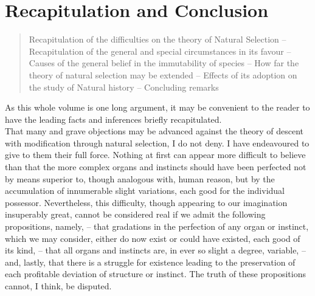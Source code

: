 \chapter{Recapitulation and Conclusion}

\begin{quotation}
Recapitulation of the difficulties on the theory of Natural Selection -- Recapitulation of the general and special circumstances in its favour -- Causes of the general belief in the immutability of species -- How far the theory of natural selection may be extended -- Effects of its adoption on the study of Natural history -- Concluding remarks
\end{quotation}

\indent As this whole volume is one long argument, it may be convenient to the reader to have the leading facts and inferences briefly recapitulated.~\\
\indent That many and grave objections may be advanced against the theory of descent with modification through natural selection, I do not deny.  I have endeavoured to give to them their full force. Nothing at first can appear more difficult to believe than that the more complex organs and instincts should have been perfected not by means superior to, though analogous with, human reason, but by the accumulation of innumerable slight variations, each good for the individual possessor. Nevertheless, this difficulty, though appearing to our imagination insuperably great, cannot be considered real if we admit the following propositions, namely, -- that gradations in the perfection of any organ or instinct, which we may consider, either do now exist or could have existed, each good of its kind, -- that all organs and instincts are, in ever so slight a degree, variable, -- and, lastly, that there is a struggle for existence leading to the preservation of each profitable deviation of structure or instinct.  The truth of these propositions cannot, I think, be disputed.~\\
